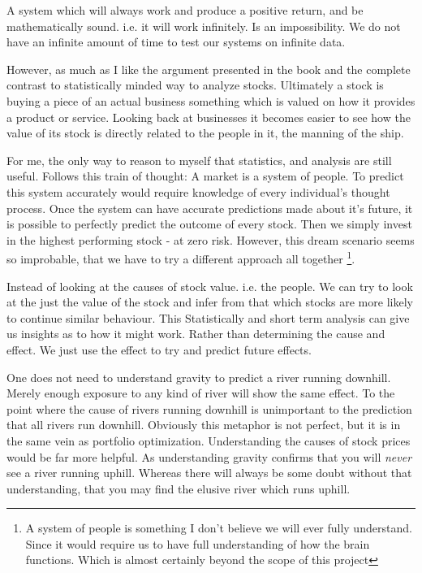 \documentclass[11pt]{article}
\begin{document}
    A system which will always work and produce a positive return, and be mathematically sound.
    i.e. it will work infinitely. Is an impossibility. We do not have an infinite amount of
    time to test our systems on infinite data.

    However, as much as I like the argument presented in the book and the complete contrast to
    statistically minded way to analyze stocks. Ultimately a stock is buying a piece of an
    actual business something which is valued on how it provides a product or service.
    Looking back at businesses it becomes easier to see how the value of its stock is directly
    related to the people in it, the manning of the ship.

    For me, the only way to reason to myself that statistics, and analysis are still 
    useful. Follows this train of thought: A market is a system of people.
    To predict this system accurately would require knowledge of every individual's
    thought process. Once the system can have accurate predictions made about it's
    future, it is possible to perfectly predict the outcome of every stock. Then
    we simply invest in the highest performing stock - at zero risk. However, this
    dream scenario seems so improbable, that we have to try a different approach
    all together
    \footnote{A system of people is something I don't believe we will ever fully understand.
    Since it would require us to have full understanding of how the brain functions. Which
    is almost certainly beyond the scope of this project}.

    Instead of looking at the causes of stock value. i.e. the people. We can try to look
    at the just the value of the stock and infer from that which stocks are more
    likely to continue similar behaviour. This 
    Statistically and short term analysis can give us insights as to 
    how it might work. Rather than determining the cause and effect. We just use the effect
    to try and predict future effects.

    One does not need to understand gravity to predict a river running downhill. Merely
    enough exposure to any kind of river will show the same effect. To the point where
    the cause of rivers running downhill is unimportant to the prediction that all
    rivers run downhill. Obviously this metaphor is not perfect, but it is in the
    same vein as portfolio optimization. Understanding the causes of stock prices would
    be far more helpful. As understanding gravity confirms that you will \textit{never}
    see a river running uphill. Whereas there will always be some doubt without that
    understanding, that you may find the elusive river which runs uphill.
\end{document}
